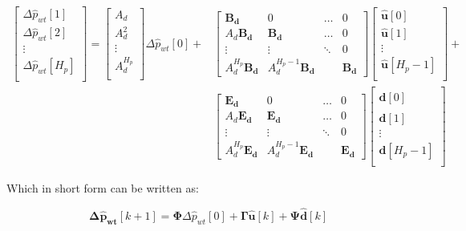 \begin{align}
	\begin{bmatrix}
\Delta \hat p_{wt}[1] \\ 
\Delta \hat p_{wt}[2]\\ 
\vdots \\ 
\Delta \hat p_{wt}[H_p]\\ 
\end{bmatrix}
=
\begin{bmatrix}
A_d \\ 
A_d^2\\ 
\vdots \\ 
A_d^{H_p}\\ 
\end{bmatrix}
\Delta \hat{p}_{wt}[0]+\nonumber
&\begin{bmatrix}
 \bm{B_d}& 0 & \hdots  & 0\\ 
 A_d\bm{B_d}&  \bm{B_d}& \hdots & 0\\ 
\vdots &\vdots  & \ddots  & 0\\ 
 A_d^{H_p}\bm{B_d}& A_d^{H_p-1}\bm{B_d}  &  & \bm{B_d}
\end{bmatrix}
\begin{bmatrix}
 \bm{\hat{u}}[0] \\ 
 \bm{\hat{u}}[1]\\ 
\vdots \\ 
 \bm{\hat{u}}[H_p-1]\\ 
\end{bmatrix}
+ \\
&\begin{bmatrix}
 \bm{E_d}& 0 & \hdots  & 0\\ 
 A_d\bm{E_d}&  \bm{E_d}& \hdots & 0\\ 
\vdots &\vdots  & \ddots  & 0\\ 
 A_d^{H_p}\bm{E_d}& A_d^{H_p-1}\bm{E_d}  &  & \bm{E_d}
\end{bmatrix}
\begin{bmatrix}
 \bm{\hat{d}}[0] \\ 
 \bm{\hat{d}}[1]\\ 
\vdots \\ 
 \bm{\hat{d}}[H_p-1]\\ 
\end{bmatrix} 
\end{align}

Which in short form can be written as: 

\begin{equation}
	\bm{\Delta \hat p_{wt}} [k+1] = \bm{\Phi} \Delta \hat p_{wt}[0] + \bm{\Gamma \hat{u}}[k] + \bm{\Psi} \bm{\hat{d}}[k]
	\label{extendedmatrix}
\end{equation}

